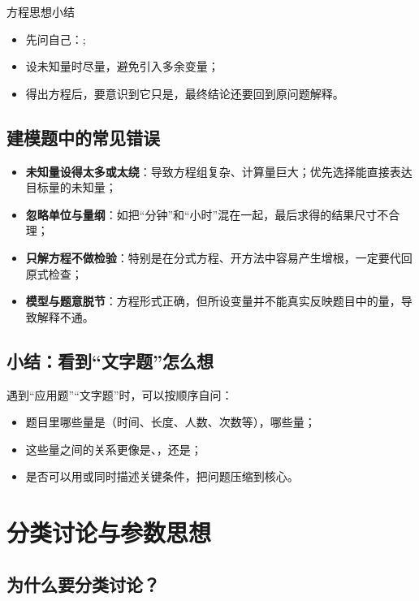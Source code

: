 \documentclass[a4paper,11pt]{ctexart}
\begin{document}
\begin{summarybox}{方程思想小结}
\begin{itemize}
  \item 先问自己：;
  \item 设未知量时尽量，避免引入多余变量；
  \item 得出方程后，要意识到它只是，最终结论还要回到原问题解释。
\end{itemize}
\end{summarybox}

\subsection{建模题中的常见错误}

\begin{itemize}
  \item \textbf{未知量设得太多或太绕}：导致方程组复杂、计算量巨大；优先选择能直接表达目标量的未知量；
  \item \textbf{忽略单位与量纲}：如把“分钟”和“小时”混在一起，最后求得的结果尺寸不合理；
  \item \textbf{只解方程不做检验}：特别是在分式方程、开方法中容易产生增根，一定要代回原式检查；
  \item \textbf{模型与题意脱节}：方程形式正确，但所设变量并不能真实反映题目中的量，导致解释不通。
\end{itemize}

\subsection{小结：看到“文字题”怎么想}

遇到“应用题”“文字题”时，可以按顺序自问：
\begin{itemize}
  \item 题目里哪些量是（时间、长度、人数、次数等），哪些量；
  \item 这些量之间的关系更像是、，还是；
  \item 是否可以用或同时描述关键条件，把问题压缩到核心。
\end{itemize}

\section{分类讨论与参数思想}

\subsection{为什么要分类讨论？}
\end{document}
